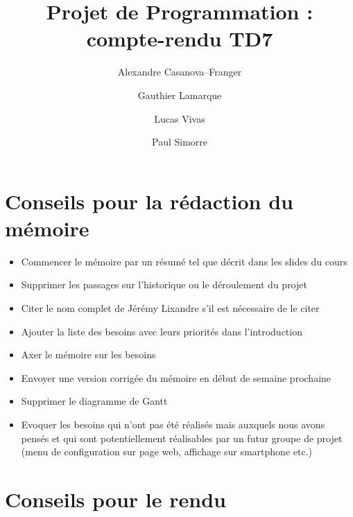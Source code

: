 \documentclass[a4paper]{article}
\title{Projet de Programmation : compte-rendu TD7}
\author{Alexandre Casanova--Franger\and Gauthier Lamarque\and Lucas Vivas\and Paul Simorre}
\begin{document}
\maketitle

\section{Conseils pour la rédaction du mémoire}

\begin{itemize}

	\item Commencer le mémoire par un résumé tel que décrit dans les slides du cours
	\item Supprimer les passages sur l'historique ou le déroulement du projet
	\item Citer le nom complet de Jérémy Lixandre s'il est nécessaire de le citer
	\item Ajouter la liste des besoins avec leurs priorités dans l'introduction
	\item Axer le mémoire sur les besoins
	\item Envoyer une version corrigée du mémoire en début de semaine prochaine
	\item Supprimer le diagramme de Gantt
	\item Evoquer les besoins qui n'ont pas été réalisés mais auxquels nous avons pensés
	      et qui sont potentiellement réalisables par un futur groupe de projet (menu de
	      configuration sur page web, affichage sur smartphone etc.)

\end{itemize}

\section{Conseils pour le rendu}
\end{document}
